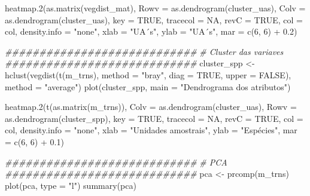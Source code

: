 \documentclass[
  letterpaper,
  DIV=11,
  numbers=noendperiod]{scrartcl}
\newenvironment{Shaded}{}{}
\newcommand{\AttributeTok}[1]{\textcolor[rgb]{0.49,0.56,0.16}{#1}}
\newcommand{\CommentTok}[1]{\textcolor[rgb]{0.38,0.63,0.69}{\textit{#1}}}
\newcommand{\ConstantTok}[1]{\textcolor[rgb]{0.53,0.00,0.00}{#1}}
\newcommand{\DecValTok}[1]{\textcolor[rgb]{0.25,0.63,0.44}{#1}}
\newcommand{\DocumentationTok}[1]{\textcolor[rgb]{0.73,0.13,0.13}{\textit{#1}}}
\newcommand{\FloatTok}[1]{\textcolor[rgb]{0.25,0.63,0.44}{#1}}
\newcommand{\FunctionTok}[1]{\textcolor[rgb]{0.02,0.16,0.49}{#1}}
\newcommand{\NormalTok}[1]{#1}
\newcommand{\OtherTok}[1]{\textcolor[rgb]{0.00,0.44,0.13}{#1}}
\newcommand{\SpecialCharTok}[1]{\textcolor[rgb]{0.25,0.44,0.63}{#1}}
\newcommand{\StringTok}[1]{\textcolor[rgb]{0.25,0.44,0.63}{#1}}
\begin{document}
\begin{Shaded}
\begin{Highlighting}[numbers=left,,]
\FunctionTok{heatmap.2}\NormalTok{(}\FunctionTok{as.matrix}\NormalTok{(vegdist\_mat),}
          \AttributeTok{Rowv =} \FunctionTok{as.dendrogram}\NormalTok{(cluster\_uas),}
          \AttributeTok{Colv =} \FunctionTok{as.dendrogram}\NormalTok{(cluster\_uas),}
          \AttributeTok{key =} \ConstantTok{TRUE}\NormalTok{, }\AttributeTok{tracecol =} \ConstantTok{NA}\NormalTok{, }\AttributeTok{revC =} \ConstantTok{TRUE}\NormalTok{,}
          \AttributeTok{col =}\NormalTok{ col,}
          \AttributeTok{density.info =} \StringTok{"none"}\NormalTok{,}
          \AttributeTok{xlab =} \StringTok{"UA´s"}\NormalTok{, }\AttributeTok{ylab =} \StringTok{"UA´s"}\NormalTok{,}
          \AttributeTok{mar =} \FunctionTok{c}\NormalTok{(}\DecValTok{6}\NormalTok{, }\DecValTok{6}\NormalTok{) }\SpecialCharTok{+} \FloatTok{0.2}\NormalTok{)}

\DocumentationTok{\#\#\#\#\#\#\#\#\#\#\#\#\#\#\#\#\#\#\#\#\#\#\#\#\#\#\#\#}
\CommentTok{\# Cluster das variaves}
\DocumentationTok{\#\#\#\#\#\#\#\#\#\#\#\#\#\#\#\#\#\#\#\#\#\#\#\#\#\#\#\#}
\NormalTok{cluster\_spp }\OtherTok{\textless{}{-}} \FunctionTok{hclust}\NormalTok{(}\FunctionTok{vegdist}\NormalTok{(}\FunctionTok{t}\NormalTok{(m\_trns), }\AttributeTok{method =} \StringTok{"bray"}\NormalTok{, }\AttributeTok{diag =} \ConstantTok{TRUE}\NormalTok{, }\AttributeTok{upper =} \ConstantTok{FALSE}\NormalTok{),}
                      \AttributeTok{method =} \StringTok{"average"}\NormalTok{)}
\FunctionTok{plot}\NormalTok{(cluster\_spp, }\AttributeTok{main =} \StringTok{"Dendrograma dos atributos"}\NormalTok{)}

\FunctionTok{heatmap.2}\NormalTok{(}\FunctionTok{t}\NormalTok{(}\FunctionTok{as.matrix}\NormalTok{(m\_trns)),}
          \AttributeTok{Colv =} \FunctionTok{as.dendrogram}\NormalTok{(cluster\_uas),}
          \AttributeTok{Rowv =} \FunctionTok{as.dendrogram}\NormalTok{(cluster\_spp),}
          \AttributeTok{key =} \ConstantTok{TRUE}\NormalTok{, }\AttributeTok{tracecol =} \ConstantTok{NA}\NormalTok{, }\AttributeTok{revC =} \ConstantTok{TRUE}\NormalTok{,}
          \AttributeTok{col =}\NormalTok{ col,}
          \AttributeTok{density.info =} \StringTok{"none"}\NormalTok{,}
          \AttributeTok{xlab =} \StringTok{"Unidades amostrais"}\NormalTok{, }\AttributeTok{ylab =} \StringTok{"Espécies"}\NormalTok{,}
          \AttributeTok{mar =} \FunctionTok{c}\NormalTok{(}\DecValTok{6}\NormalTok{, }\DecValTok{6}\NormalTok{) }\SpecialCharTok{+} \FloatTok{0.1}\NormalTok{)}

\DocumentationTok{\#\#\#\#\#\#\#\#\#\#\#\#\#\#\#\#\#\#\#\#\#\#\#\#\#\#\#\#}
\CommentTok{\# PCA}
\DocumentationTok{\#\#\#\#\#\#\#\#\#\#\#\#\#\#\#\#\#\#\#\#\#\#\#\#\#\#\#\#}
\NormalTok{pca }\OtherTok{\textless{}{-}} \FunctionTok{prcomp}\NormalTok{(m\_trns)}
\FunctionTok{plot}\NormalTok{(pca, }\AttributeTok{type =} \StringTok{"l"}\NormalTok{)}
\FunctionTok{summary}\NormalTok{(pca)}


\end{Highlighting}
\end{Shaded}
\end{document}
